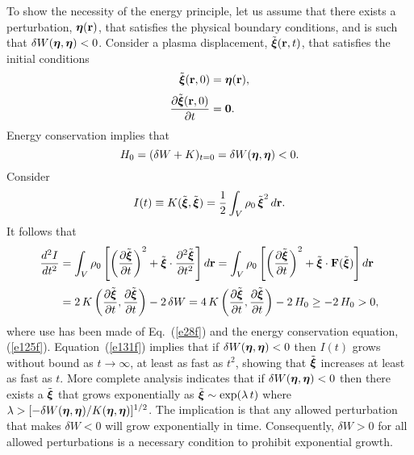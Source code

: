 \documentclass[12pt,prb,aps,notitlepage]{revtex4-1}
\newcommand{\bxi}{\mbox{\boldmath$\xi$}}
\newcommand{\bta}{\mbox{\boldmath$\eta$}}
\begin{document}
To show the necessity of the energy principle, let us assume that there exists a perturbation, $\bta({\bf r})$, that satisfies the physical boundary conditions,
 and is such that
$\delta W(\bta,\bta)<0$. Consider a plasma displacement, $\tilde{\bxi}({\bf r},t)$, that satisfies the initial conditions
\begin{align}
\tilde{\bxi}({\bf r},0)&= \bta({\bf r}),\\[0.5ex]
\frac{\partial\tilde{\bxi}({\bf r},0)}{\partial t}&= {\bf 0}.
\end{align}
Energy conservation implies that
\begin{equation}
H_0 = (\delta W+ K)_{t=0}= \delta W(\bta,\bta) < 0.
\end{equation}
Consider 
\begin{equation}
I(t) \equiv K(\tilde{\bxi},\tilde{\bxi})=\frac{1}{2}\int_V \rho_0\,\tilde{\bxi}^2\,d{\bf r}.
\end{equation}
It follows that
\begin{align}\label{e131f}
\frac{d^2 I}{dt^2} &= \int_V \rho_0\left[\left(\frac{\partial\tilde{\bxi}}{\partial t}\right)^2+ \tilde{\bxi}\cdot\frac{\partial^2\tilde{\bxi}}{\partial t^2}\right]d{\bf r}
=  \int_V \rho_0\left[\left(\frac{\partial\tilde{\bxi}}{\partial t}\right)^2+ \tilde{\bxi}\cdot{\bf F}(\tilde{\bxi})\right]d{\bf r}\nonumber\\[0.5ex]
&= 2\,K\left(\frac{\partial\tilde{\bxi}}{\partial t},\frac{\partial\tilde{\bxi}}{\partial t}\right) - 2\,\delta W= 4\,K\left(\frac{\partial\tilde{\bxi}}{\partial t}, 
\frac{\partial\tilde{\bxi}}{\partial t}\right) -2\,H_0\geq -2\,H_0 > 0,
\end{align}
where use has been made of  Eq.~(\ref{e28f})
and the energy conservation equation, (\ref{e125f}). Equation~(\ref{e131f}) implies that if $\delta W(\bta,\bta)<0$ then $I(t)$ grows without
bound as $t\rightarrow \infty$, at least as fast as $t^2$,  showing that $\tilde{\bxi}$ increases at least as fast as $t$. More complete analysis indicates that
if $\delta W(\bta,\bta)<0$ then there exists a $\tilde{\bxi}$ that grows exponentially as $\tilde{\bxi}\sim \exp(\lambda\,t)$ where
$\lambda > [-\delta W(\bta,\bta)/K(\bta,\bta)]^{1/2}$. The implication is that any allowed perturbation that makes $\delta W<0$
will grow exponentially in time. Consequently, $\delta W>0$ for all allowed perturbations is a necessary condition to prohibit exponential growth. 
\end{document}

